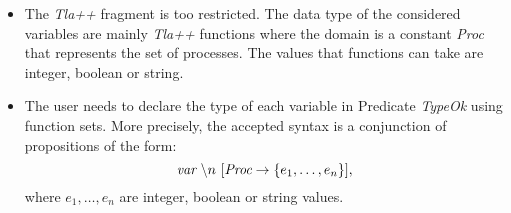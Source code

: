 \documentclass{article}
\begin{document}
\begin{itemize}

\item The \emph{Tla++} fragment is too restricted. The data type of the considered variables are mainly \emph{Tla++} functions where the domain is a constant \emph{Proc} that represents the set of processes. The values that functions can take are integer, boolean or string.  
\item  The user needs to declare the type of each variable in Predicate \emph{TypeOk} using function sets. More precisely, 
 the accepted syntax is a conjunction of propositions of the form:
$$ \emph{var} \textrm{ } \backslash n \textrm{ }  [ \emph{Proc}   \rightarrow   \{ e_1, \dots, e_n \} ], $$
 where $e_1, \dots, e_n$ are integer, boolean or string values. 

\end{itemize}
\end{document}
